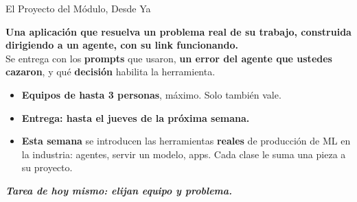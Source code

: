 \documentclass[aspectratio=169, 11pt]{beamer}
\begin{document}
\begin{frame}[shrink=5]{El Proyecto del Módulo, Desde Ya}
  \vspace{1pt}
  \begin{tcolorbox}[colback=arcaGray, colframe=arcaRed, boxrule=0pt,
    leftrule=4pt, arc=3pt, left=9pt, right=9pt, top=3pt, bottom=3pt]
    {\footnotesize\color{arcaDark}\bfseries
     Una aplicación que resuelva un problema real de su trabajo, construida
     dirigiendo a un agente, con su link funcionando.}\\[4pt]
    {\scriptsize\color{textMuted}
     Se entrega con los \textbf{prompts} que usaron, \textbf{un error del
     agente que ustedes cazaron}, y qué \textbf{decisión} habilita la
     herramienta.}
  \end{tcolorbox}
  \vspace{1pt}
  {\scriptsize\color{textMuted}
  \begin{itemize}\setlength{\itemsep}{2pt}
    \item[{\color{arcaRed}\scriptsize\faUsers}]
      \textbf{Equipos de hasta 3 personas}, máximo. Solo también vale.
    \item[{\color{arcaRed}\scriptsize\faCalendarCheck}]
      \textbf{Entrega: hasta el jueves de la próxima semana.}
    \item[{\color{arcaRed}\scriptsize\faRoad}]
      \textbf{Esta semana} se introducen las herramientas \textbf{reales} de
      producción de ML en la industria: agentes, servir un modelo, apps.
      Cada clase le suma una pieza a su proyecto.
  \end{itemize}}
  \vspace{1pt}
  {\scriptsize\color{arcaDark}\bfseries\itshape
   Tarea de hoy mismo: elijan equipo y problema.}
\end{frame}
\end{document}
